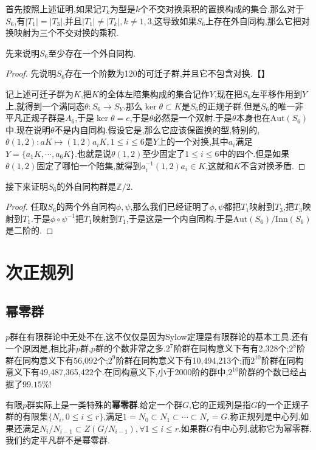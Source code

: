 首先按照上述证明,如果记$T_k$为型是$k$个不交对换乘积的置换构成的集合.那么对于$S_6$,有$|T_1|=|T_3|$,并且$|T_1|\not=|T_k|,k\not=1,3$,这导致如果$S_6$上存在外自同构,那么它把对换映射为三个不交对换的乘积.

先来说明$S_6$至少存在一个外自同构.
\begin{proof}
	
	先说明$S_6$存在一个阶数为120的可迁子群,并且它不包含对换.【】
	
	记上述可迁子群为$K$,把$K$的全体左陪集构成的集合记作$Y$,现在把$S_6$左平移作用到$Y$上,就得到一个满同态$\theta:S_6\to S_Y$.那么$\ker\theta\subset K$是$S_6$的正规子群.但是$S_6$的唯一非平凡正规子群是$A_6$,于是$\ker\theta={e}$,于是$\theta$必然是一个双射.于是$\theta$本身也在$\mathrm{Aut}(S_6)$中.现在说明$\theta$不是内自同构.假设它是,那么它应该保置换的型,特别的,$\theta(1,2):aK\mapsto(1,2)a_iK,1\le i\le6$是$Y$上的一个对换,其中$a_i$满足$Y=\{a_1K,\cdots,a_6K\}$.也就是说$\theta(1,2)$至少固定了$1\le i\le6$中的四个.但是如果$\theta(1,2)$固定了哪怕一个陪集,就得到$a_i^{-1}(1,2)a_i\in K$,这就和$K$不含对换矛盾.
\end{proof}

接下来证明$S_6$的外自同构群是$\mathbb{Z}/2$.
\begin{proof}
	
	任取$S_6$的两个外自同构$\phi,\psi$,那么我们已经证明了$\phi,\psi$都把$T_1$映射到$T_3$,把$T_3$映射到$T_1$.于是$\phi\circ\psi^{-1}$把$T_1$映射到$T_1$,于是这是一个内自同构.于是$\mathrm{Aut}(S_6)/\mathrm{Inn}(S_6)$是二阶的.
\end{proof}
\newpage
\section{次正规列}
\subsection{幂零群}

$p$群在有限群论中无处不在,这不仅仅是因为Sylow定理是有限群论的基本工具.还有一个原因是,相比非$p$群,$p$群的个数非常之多.$2^7$阶群在同构意义下有有2,328个;$2^8$阶群在同构意义下有56,092个;$2^9$阶群在同构意义下有10,494,213个;而$2^{10}$阶群在同构意义下有49,487,365,422个.在同构意义下,小于2000阶的群中,$2^{10}$阶群的个数已经占据了$99.15\%$!

有限$p$群实际上是一类特殊的\textbf{幂零群}.给定一个群$G$,它的正规列是指$G$的一个正规子群的有限集$\{N_i,0\le i\le r\}$,满足$1=N_0\subset N_1\subset\cdots\subset N_r=G$.称正规列是中心列,如果还满足$N_i/N_{i-1}\subset Z(G/N_{i-1}),\forall 1\le i\le r$.如果群$G$有中心列,就称它为幂零群.我们约定平凡群不是幂零群.

